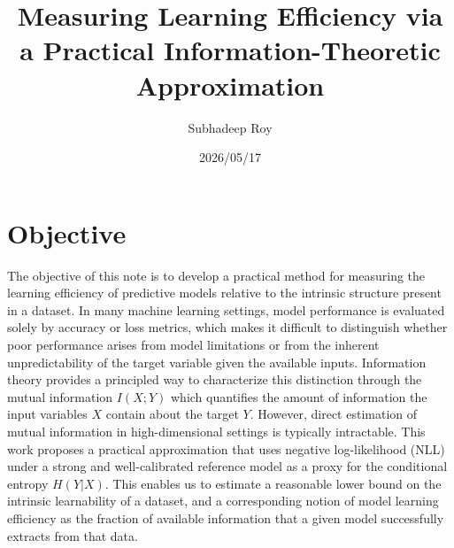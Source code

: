 \documentclass{article}
\title{Measuring Learning Efficiency via a Practical Information-Theoretic Approximation}
\author{Subhadeep Roy}
\date{2026/05/17}
\begin{document}
\maketitle

\begin{center}
\end{center}
\tableofcontents

\section{Objective}
The objective of this note is to develop a practical method for measuring the learning efficiency of predictive models 
relative to the intrinsic structure present in a dataset. 
In many machine learning settings, model performance is evaluated solely by accuracy or loss metrics, 
which makes it difficult to distinguish whether poor performance arises from model limitations or 
from the inherent unpredictability of the target variable given the available inputs. 
Information theory provides a principled way to characterize this distinction through the mutual information 
$I(X ; Y)$ which quantifies the amount of information the input variables $X$ contain about the 
target $Y$. 
However, direct estimation of mutual information in high-dimensional settings is typically intractable. 
This work proposes a practical approximation that uses negative log-likelihood (NLL) under a strong and 
well-calibrated reference model as a proxy for the conditional entropy 
$H(Y | X)$. This enables us to estimate a reasonable lower bound on the 
intrinsic learnability of a dataset, and a corresponding notion of model learning efficiency as the fraction of available information that a given model successfully extracts from that data.
\end{document}
